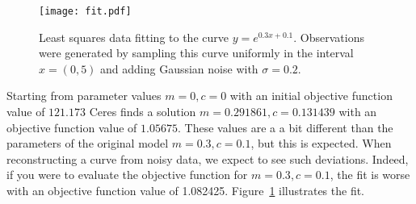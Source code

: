 \begin{figure}[t]
	\begin{center}
	\texttt{[image: fit.pdf]}
	\caption{Least squares data fitting to the curve $y = e^{0.3x + 0.1}$. Observations were generated by sampling this curve uniformly in the interval $x=(0,5)$ and adding Gaussian noise with $\sigma = 0.2$.\label{fig:exponential}}
\end{center}
\end{figure}

Starting from parameter values $m = 0, c=0$ with an initial objective function value of $121.173$ Ceres finds a solution $m= 0.291861, c = 0.131439$ with an objective function value of $1.05675$. These values are a a bit different than the parameters of the original model $m=0.3, c= 0.1$, but this is expected. When reconstructing a curve from noisy data, we expect to see such deviations. Indeed, if you were to evaluate the objective function for $m=0.3, c=0.1$, the fit is worse with an objective function value of 1.082425. Figure~\ref{fig:exponential} illustrates the fit.
